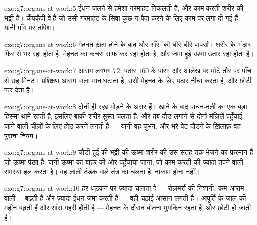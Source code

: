\begin{solution}{exo:g7:organs-at-work:5}
ईंधन जलने से हमेशा गरमाहट निकलती है, और काम करती  शरीर की भट्ठी है।
कँपकँपी वे  हैं जो उसी गरमाहट के सिवा कुछ न पैदा करने के लिए काम
पर लगा दी गई हैं --- यानी माँग पर तपिश।
\end{solution}

\begin{solution}{exo:g7:organs-at-work:6}
मेहनत ख़त्म होने के बाद  और साँस की धीरे-धीरे वापसी। शरीर 
के भंडार फिर से भर रहा होता है, मेहनत का कचरा साफ़ कर रहा होता है, और
जमा हुई ऊष्मा उतार रहा होता है।
\end{solution}

\begin{solution}{exo:g7:organs-at-work:7}
आराम लगभग $72$; पठार $160$ के पास; और आलेख पर  मोटे तौर पर पाँच से
छह मिनट। प्रशिक्षण आराम वाला मान घटाता है, उसी मेहनत के लिए पठार नीचा
करता है, और  छोटी कर देता है।
\end{solution}

\begin{solution}{exo:g7:organs-at-work:8}
दोनों ही रुख़ मोड़ने के असर हैं। खाने के बाद पाचन-नली  का एक बड़ा
हिस्सा थामे रहती है, इसलिए बाक़ी शरीर सुस्त चलता है; और तब दौड़ लगाने से
दोनों मंज़िलें पहुँचाई जाने वाली चीज़ों के लिए होड़ करने लगती हैं ---
यानी वह चुभन, और भरे पेट दौड़ने के ख़िलाफ़ वह पुराना नियम।
\end{solution}

\begin{solution}{exo:g7:organs-at-work:9}
चौड़ी हुई  की  भट्ठी की ऊष्मा शरीर की उस सतह तक भेजने का
फ़रमान हैं जो ऊष्मा-पंखा है: यानी ऊष्मा का बाहर की ओर पहुँचाया जाना, जो
काम करती  की ज़्यादा तपने वाली समस्या हल करता है। वह लाली ठंडक
वाले तंत्र का चलना है, नाकाम होना नहीं।
\end{solution}

\begin{solution}{exo:g7:organs-at-work:10}
 हर धड़कन पर ज़्यादा  चलाता है --- रोज़मर्रा की निशानी, कम आराम
वाली ।  बढ़ती हैं और ज़्यादा ईंधन जमा करती हैं --- वही चढ़ाई
आसान लगती है। आपूर्ति के जाल की महीन  बढ़ती हैं और साँस गहरी
होती है --- मेहनत के दौरान बोलना मुमकिन रहता है, और  छोटी हो जाती
है।
\end{solution}


